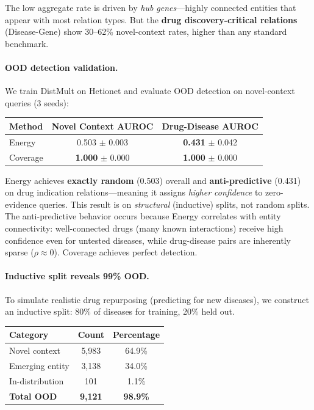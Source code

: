 The low aggregate rate is driven by \emph{hub genes}---highly connected entities that appear with most relation types. But the \textbf{drug discovery-critical relations} (Disease-Gene) show 30--62\% novel-context rates, higher than any standard benchmark.

\paragraph{OOD detection validation.}
We train DistMult on Hetionet and evaluate OOD detection on novel-context queries (3 seeds):

\begin{center}
\small
\begin{tabular}{lcc}
\toprule
Method & Novel Context AUROC & Drug-Disease AUROC \\
\midrule
Energy & 0.503 $\pm$ 0.003 & \textbf{0.431} $\pm$ 0.042 \\
Coverage & \textbf{1.000} $\pm$ 0.000 & \textbf{1.000} $\pm$ 0.000 \\
\bottomrule
\end{tabular}
\end{center}

Energy achieves \textbf{exactly random} (0.503) overall and \textbf{anti-predictive} (0.431) on drug indication relations---meaning it assigns \emph{higher confidence} to zero-evidence queries. This result is on \emph{structural} (inductive) splits, not random splits. The anti-predictive behavior occurs because Energy correlates with entity connectivity: well-connected drugs (many known interactions) receive high confidence even for untested diseases, while drug-disease pairs are inherently sparse ($\rho \approx 0$). Coverage achieves perfect detection.

\paragraph{Inductive split reveals 99\% OOD.}
To simulate realistic drug repurposing (predicting for new diseases), we construct an inductive split: 80\% of diseases for training, 20\% held out.

\begin{center}
\small
\begin{tabular}{lcc}
\toprule
Category & Count & Percentage \\
\midrule
Novel context & 5,983 & 64.9\% \\
Emerging entity & 3,138 & 34.0\% \\
In-distribution & 101 & 1.1\% \\
\textbf{Total OOD} & \textbf{9,121} & \textbf{98.9\%} \\
\bottomrule
\end{tabular}
\end{center}

